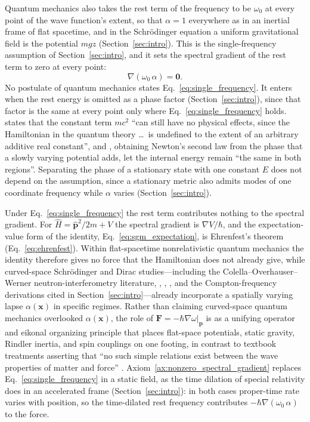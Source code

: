 \documentclass[aps,prd,onecolumn,tightenlines,nofootinbib,notitlepage,11pt,floatfix]{revtex4-2}
\theoremstyle{indentedtheorem}
\begin{document}
Quantum mechanics also takes the rest term of the frequency to be $\omega_0$ at every point of the wave function's extent, so that $\alpha=1$ everywhere as in an inertial frame of flat spacetime, and in the Schr\"odinger equation a uniform gravitational field is the potential $mgz$ (Section~\ref{sec:intro}). This is the single-frequency assumption of Section~\ref{sec:intro}, and it sets the spectral gradient of the rest term to zero at every point:
\begin{equation}
    \nabla(\omega_0\,\alpha) = \mathbf{0} .
    \label{eq:single_frequency}
\end{equation}
No postulate of quantum mechanics states Eq.~\eqref{eq:single_frequency}. It enters when the rest energy is omitted as a phase factor (Section~\ref{sec:intro}), since that factor is the same at every point only where Eq.~\eqref{eq:single_frequency} holds. \citet{Dirac1947Principles} states that the constant term $mc^2$ ``can still have no physical effects, since the Hamiltonian in the quantum theory \ldots\ is undefined to the extent of an arbitrary additive real constant'', and \citet{Feynman1965Lectures3}, obtaining Newton's second law from the phase that a slowly varying potential adds, let the internal energy remain ``the same in both regions''. Separating the phase of a stationary state with one constant $E$ does not depend on the assumption, since a stationary metric also admits modes of one coordinate frequency while $\alpha$ varies (Section~\ref{sec:intro}).

Under Eq.~\eqref{eq:single_frequency} the rest term contributes nothing to the spectral gradient. For $\hat{H}=\hat{\mathbf{p}}^2/2m+V$ the spectral gradient is $\nabla V/\hbar$, and the expectation-value form of the identity, Eq.~\eqref{eq:sgm_expectation}, is Ehrenfest's theorem (Eq.~\eqref{eq:ehrenfest}). Within flat-spacetime nonrelativistic quantum mechanics the identity therefore gives no force that the Hamiltonian does not already give, while curved-space Schr\"odinger and Dirac studies---including the Colella--Overhauser--Werner neutron-interferometry literature, \citet{HehlNi1990Inertial}, \citet{ObukhovSilenkoTeryaev2011Dirac}, \citet{Perche2022Localized}, and the Compton-frequency derivations cited in Section~\ref{sec:intro}---already incorporate a spatially varying lapse $\alpha(\mathbf{x})$ in specific regimes. Rather than claiming curved-space quantum mechanics overlooked $\alpha(\mathbf{x})$, the role of $\mathbf{F}=-\hbar\nabla\omega|_{\mathbf{p}}$ is as a unifying operator and eikonal organizing principle that places flat-space potentials, static gravity, Rindler inertia, and spin couplings on one footing, in contrast to textbook treatments asserting that ``no such simple relations exist between the wave properties of matter and force'' \citep{Bohm1951Quantum}. Axiom~\ref{ax:nonzero_spectral_gradient} replaces Eq.~\eqref{eq:single_frequency} in a static field, as the time dilation of special relativity does in an accelerated frame (Section~\ref{sec:intro}): in both cases proper-time rate varies with position, so the time-dilated rest frequency contributes $-\hbar\nabla(\omega_0\,\alpha)$ to the force.
\end{document}
